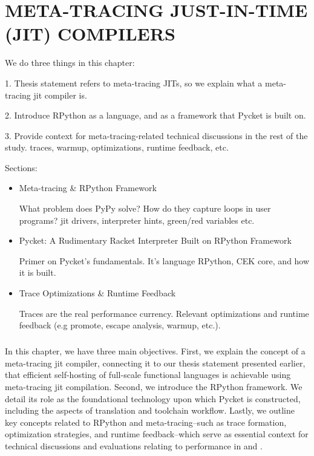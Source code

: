 \chapter[\texorpdfstring{META-TRACING JUST-IN-TIME (JIT) COMPILERS}
                          {2. RPython \& Meta-tracing}]{META-TRACING JUST-IN-TIME (JIT) COMPILERS}
    \label{chapter:rpython}

    \begin{chaptersynopsis}
        \footnotesize

        We do three things in this chapter:

        1. Thesis statement refers to meta-tracing JITs, so we explain what a meta-tracing \gls{jit} compiler is.

        2. Introduce RPython as a language, and as a framework that Pycket is built on.

        3. Provide context for meta-tracing-related technical discussions in the rest of the study. traces, warmup, optimizations, runtime feedback, etc.

        \vspace{2em}

        Sections:
		\begin{itemize}
			\item Meta-tracing \& RPython Framework

                What problem does PyPy solve? How do they capture loops in user programs? \gls{jit} drivers, interpreter hints, green/red variables etc.
			\item Pycket: A Rudimentary Racket Interpreter Built on RPython Framework

                Primer on Pycket's fundamentals. It's language RPython, CEK core, and how it is built.
			\item Trace Optimizations \& Runtime Feedback

                Traces are the real performance currency. Relevant optimizations and runtime feedback (e.g promote, escape analysis, warmup, etc.).
		\end{itemize}
    \end{chaptersynopsis}

    \paragraph{}%
        In this chapter, we have three main objectives. First, we explain the concept of a meta-tracing \gls{jit} compiler, connecting it to our thesis statement presented earlier, that efficient self-hosting of full-scale functional languages is achievable using meta-tracing \gls{jit} compilation. Second, we introduce the RPython framework. We detail its role as the foundational technology upon which Pycket is constructed, including the aspects of translation and toolchain workflow. Lastly, we outline key concepts related to RPython and meta-tracing--such as trace formation, optimization strategies, and runtime feedback--which serve as essential context for technical discussions and evaluations relating to performance in  and .

